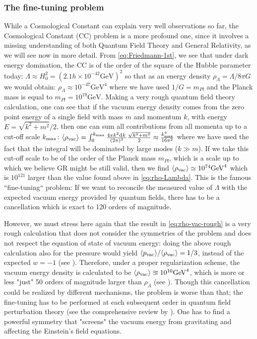 \subsubsection*{The fine-tuning problem}
While a Cosmological Constant can explain very well observations so far, the Cosmological Constant (CC) problem is a more profound one, since it 
involves a missing understanding of both Quantum Field Theory and General Relativity, as we will see now in more detail.
From \cref{eq:Friedmann-1st}, we see that under dark energy domination, 
the CC is of the order of the square of the Hubble parameter today:
\beeqp$
\Lambda \approx H_0^2 = (2.1 h \times 10^{-42} \mathrm{GeV})^2
$
so that as an energy density $\rho_{\Lambda} = \Lambda / 8\pi G$ we would obtain:
\beeqc$\label{eq:rho-Lambda}
\rho_{\Lambda} \approx 10^{-47} \mathrm{GeV}^4
$
where we have used $1/G = m_{Pl} $ and the Planck mass is equal to $m_{Pl} = 10^{19} \mathrm{GeV}$.
Making a very rough quantum field theory calculation, one can see that if the vacuum energy density comes from the zero point energy of a single field with mass $ m $ and momentum $ k $, with energy
$E = \sqrt{k^2 + m^2}/2$,
then one can sum all contributions from all momenta up to a cut-off scale $k_{\rm max}$:
\beeqc
 $\langle \rho_{\rm vac} \rangle = \int_{0}^{k_{\rm max}} \frac{4\pi k^2 \mathrm{d}^{} {k} \,}{(2\pi)^3}\frac{\sqrt{k^2 + m^2}}{2} \approx \frac{k_{\rm max}^4}{16 \pi ^2} 
$
where we have used the fact that the integral will be dominated by large modes ($k \gg m$).
If we take this cut-off scale to be of the order of the Planck mass $m_{Pl}$, which is a scale up to which we believe GR might be still valid, then we find
\beeqc$\label{eq:rho-vac-rough}
\langle \rho_{\rm vac} \rangle \simeq 10^{74} \mathrm{GeV}^4
$
which is $10^{121}$ larger than the value found above in \cref{eq:rho-Lambda}.
This is the famous ``fine-tuning`` problem: If we want to reconcile the measured 
value of $\Lambda$ with the expected vacuum energy provided by quantum fields, 
there has to be a cancellation which is exact to 120 orders of magnitude.

However, we must stress here again that the result in \cref{eq:rho-vac-rough} 
is a very rough calculation
that does not consider the symmetries of the problem and does not respect the equation of state
of vacuum energy: doing the above rough calculation also for the pressure 
would yield $\langle p_{\rm vac} \rangle / \langle \rho_{\rm vac} \rangle  = 1/3$, instead of the expected $w=-1$ (see ).
Therefore, under a proper regularization scheme, the vacuum energy density is calculated to be 
$\langle \rho_{\rm vac} \rangle \approxeq 10^{10} \mathrm{GeV}^4$, which is more or less "just"
50 orders of magnitude larger than $\rho_{\Lambda}$ (see ).
Though this cancellation could be realized by different mechanisms, the problem is worse than that;
the fine-tuning has to be performed at each subsequent order in quantum field perturbation theory (see the comprehensive review by ). 
One has to find a powerful symmetry that
"screens" the vacuum energy from gravitating and affecting the Einstein's field equations.


